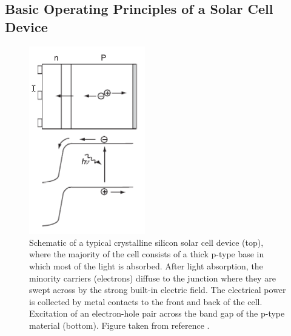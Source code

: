 \subsection{Basic Operating Principles of a Solar Cell Device}


\begin{figure}[h!]
  \centering
    \includegraphics[width=0.45\textwidth]{figures/PV_schematic.png}
    \caption{Schematic of a typical crystalline silicon solar cell device (top), where the majority of the cell consists of a thick p-type base in which most of the light is absorbed.  After light absorption, the minority carriers (electrons) diffuse to the junction where they are swept across by the strong built-in electric field. The electrical power is collected by metal contacts to the front and back of the cell. Excitation of an electron-hole pair across the band gap of the p-type material (bottom). 
    Figure taken from reference .}
  \label{PV_schematic}
\end{figure}


